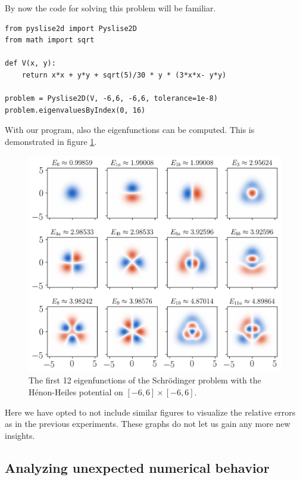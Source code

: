 By now the code for solving this problem will be familiar.

\begin{verbatim}
from pyslise2d import Pyslise2D
from math import sqrt

def V(x, y):
    return x*x + y*y + sqrt(5)/30 * y * (3*x*x- y*y)

problem = Pyslise2D(V, -6,6, -6,6, tolerance=1e-8)
problem.eigenvaluesByIndex(0, 16)
\end{verbatim}

With our program, also the eigenfunctions can be computed. This is demonstrated in figure \ref{fig:henon_heiles_eigenfunction}.
\begin{figure}
  \begin{center}
    \includegraphics[width=\linewidth]{img/chapter3/experiments/henon_heiles_eigenfunctions.png}
    \caption{\label{fig:henon_heiles_eigenfunction} The first 12 eigenfunctions of the Schrödinger problem with the Hénon-Heiles potential on $[-6, 6]\times[-6,6]$.}
  \end{center}
\end{figure}

Here we have opted to not include similar figures to visualize the relative errors as in the previous experiments. These graphs do not let us gain any more new insights.

\subsection{Analyzing unexpected numerical behavior}\label{sec:c3_conclusion_hypothesis}

